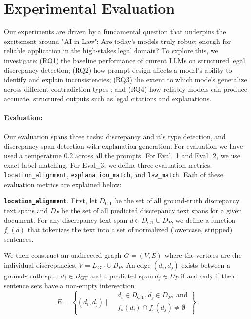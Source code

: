 \documentclass[11pt]{article}
\begin{document}
\section{Experimental Evaluation}

Our experiments are driven by a fundamental question that underpins the excitement around "AI in Law": Are today's models truly robust enough for reliable application in the high-stakes legal domain? To explore this, we investigate: (RQ1) the baseline performance of current LLMs on structured legal discrepancy detection; (RQ2) how prompt design affects a model's ability to identify and explain inconsistencies; (RQ3) the extent to which models generalize across different contradiction types ; and (RQ4) how reliably models can produce accurate, structured outputs such as legal citations and explanations.

\paragraph{Evaluation:} Our evaluation spans three tasks: discrepancy and it's type detection, and discrepancy span detection with explanation
generation. For evaluation we have used a temperature 0.2 across all the prompts. For Eval\_1 and Eval\_2, we use exact label matching. For Eval\_3, we define three evaluation metrics: \texttt{location\_alignment}, \texttt{explanation\_match}, and \texttt{law\_match}. Each of these evaluation metrics are explained below:

\texttt{\textbf{location\_alignment}}. First, let $D_{\text{GT}}$ be the set of all ground-truth discrepancy text spans and $D_{P}$ be the set of all predicted discrepancy text spans for a given document. For any discrepancy text span $d \in D_{\text{GT}} \cup D_{P}$, we define a function $f_{s}(d)$ that tokenizes the text into a set of normalized (lowercase, stripped) sentences.

We then construct an undirected graph $G = (V, E)$ where the vertices are the individual discrepancies, $V = D_{\text{GT}} \cup D_{P}$. An edge $(d_i, d_j)$ exists between a ground-truth span $d_i \in D_{\text{GT}}$ and a predicted span $d_j \in D_{P}$ if and only if their sentence sets have a non-empty intersection:
\begin{equation}
E = \left\{ (d_i, d_j) \mid
    \begin{aligned}
        & d_i \in D_{\text{GT}}, d_j \in D_{P}, \text{ and} \\
        & f_{s}(d_i) \cap f_{s}(d_j) \neq \emptyset
    \end{aligned}
\right\}
\end{equation}
\end{document}
